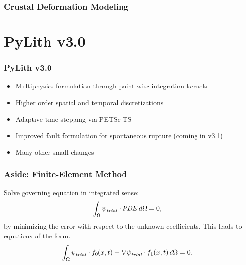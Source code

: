 \documentclass[aspectratio=169]{beamer}
\begin{document}
\begin{frame}
  \frametitle{Crustal Deformation Modeling}

  
\end{frame}


\section{PyLith v3.0}

\begin{frame}
  \frametitle{PyLith v3.0}
  \summary{}

  \begin{itemize}
  \item Multiphysics formulation through point-wise integration kernels
  \item Higher order spatial and temporal discretizations
  \item Adaptive time stepping via PETSc TS
  \item Improved fault formulation for spontaneous rupture (coming in
    v3.1)
  \item Many other small changes
  \end{itemize}

\end{frame}

\abovedisplayskip=2pt
\abovedisplayshortskip=2pt
\belowdisplayskip=2pt
\belowdisplayshortskip=2pt

\begin{frame}
  \frametitle{Aside: Finite-Element Method}

  Solve governing equation in integrated sense:
  \begin{equation}
    \int_\Omega {\psi_\mathit{trial}^{}} \cdot \mathit{PDE} \, d\Omega = 0,
  \end{equation}
  by minimizing the error with respect to the unknown coefficients.
  \vfill
  This leads to equations of the form:
  \begin{equation}
    \int_\Omega {\psi_\mathit{trial}^{}} \cdot f_0(x,t) + \nabla {\psi_\mathit{trial}^{}} \cdot f_1(x,t) \, d\Omega = 0.
  \end{equation}

\end{frame}
\end{document}
